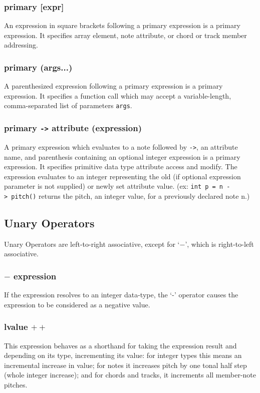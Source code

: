 \documentclass[letterpaper]{article}
\begin{document}
\subsubsection{primary [expr]}
An expression in square brackets following a primary expression is a primary expression. It specifies array element, note attribute, or chord or track member addressing. 

\subsubsection{primary (args...)}
A parenthesized expression following a primary expression is a primary expression. It specifies a function call which may accept a variable-length, comma-separated list of parameters \texttt{args}.

\subsubsection{primary \texttt{-\textgreater} attribute (expression)}
A primary expression which evaluates to a note followed by \texttt{-\textgreater}, an attribute name, and parenthesis containing an optional integer expression is a primary expression. It specifies primitive data type attribute access and modify. The expression evaluates to an integer representing the old (if optional expression parameter is not supplied) or newly set attribute value. (ex:  \texttt{int p = n -\textgreater\ pitch()} returns the pitch, an integer value, for a previously declared note n.)

\subsection{Unary Operators}
Unary Operators are left-to-right associative, except for `$-$', which is right-to-left associative.

\subsubsection{$-$ expression}
If the expression resolves to an integer data-type, the `-' operator causes the expression to be considered as a negative value.

\subsubsection{lvalue $++$}
This expression behaves as a shorthand for taking the expression result and depending on its type, incrementing its value: for integer types this means an incremental increase in value; for notes it increases pitch by one tonal half step (whole integer increase); and for chords and tracks, it increments all member-note pitches. 
\end{document}
